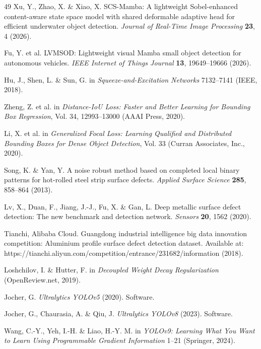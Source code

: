 \documentclass[pdflatex,sn-nature]{sn-jnl}
\begin{document}
\begin{thebibliography}{49}
Xu, Y., Zhao, X. \& Xiao, X. SCS-Mamba: A lightweight Sobel-enhanced content-aware state space model with shared deformable adaptive head for efficient underwater object detection. \textit{Journal of Real-Time Image Processing} \textbf{23}, 4 (2026).

Fu, Y. et al. LVMSOD: Lightweight visual Mamba small object detection for autonomous vehicles. \textit{IEEE Internet of Things Journal} \textbf{13}, 19649--19666 (2026).

Hu, J., Shen, L. \& Sun, G. in \textit{Squeeze-and-Excitation Networks} 7132--7141 (IEEE, 2018).

Zheng, Z. et al. in \textit{Distance-IoU Loss: Faster and Better Learning for Bounding Box Regression}, Vol. 34, 12993--13000 (AAAI Press, 2020).

Li, X. et al. in \textit{Generalized Focal Loss: Learning Qualified and Distributed Bounding Boxes for Dense Object Detection}, Vol. 33 (Curran Associates, Inc., 2020).

Song, K. \& Yan, Y. A noise robust method based on completed local binary patterns for hot-rolled steel strip surface defects. \textit{Applied Surface Science} \textbf{285}, 858--864 (2013).

Lv, X., Duan, F., Jiang, J.-J., Fu, X. \& Gan, L. Deep metallic surface defect detection: The new benchmark and detection network. \textit{Sensors} \textbf{20}, 1562 (2020).

Tianchi, Alibaba Cloud. Guangdong industrial intelligence big data innovation competition: Aluminium profile surface defect detection dataset. Available at: https://tianchi.aliyun.com/competition/entrance/231682/information (2018).

Loshchilov, I. \& Hutter, F. in \textit{Decoupled Weight Decay Regularization} (OpenReview.net, 2019).

Jocher, G. \textit{Ultralytics YOLOv5} (2020). Software.

Jocher, G., Chaurasia, A. \& Qiu, J. \textit{Ultralytics YOLOv8} (2023). Software.

Wang, C.-Y., Yeh, I.-H. \& Liao, H.-Y. M. in \textit{YOLOv9: Learning What You Want to Learn Using Programmable Gradient Information} 1--21 (Springer, 2024).


\end{thebibliography}
\end{document}
